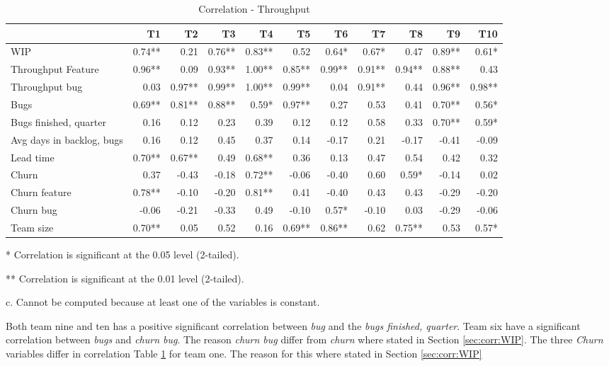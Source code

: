 \documentclass[UKenglish]{ifimaster}  %
\begin{document}
\begin{table}[!htbp]
 \begin{adjustwidth}{-1.5cm}{}
 \centering
 \begin{tabular}{|l|r|r|r|r|r|r|r|r|r|r|}
\hline
 & \bf{T1} & \bf{T2} & \bf{T3} & \bf{T4} & \bf{T5} & \bf{T6} & \bf{T7} & \bf{T8} & \bf{T9} & \bf{T10}\\ \hline
 WIP  & 0.74** & 0.21 & 0.76** & 0.83** & 0.52 & 0.64* & 0.67* & 0.47 & 0.89** & 0.61* \\ \hline
 Throughput Feature  & 0.96** & 0.09 & 0.93** & 1.00** & 0.85** & 0.99** & 0.91** & 0.94** & 0.88** & 0.43 \\ \hline
 Throughput bug  & 0.03 & 0.97** & 0.99** & 1.00** & 0.99** & 0.04 & 0.91** & 0.44 & 0.96** & 0.98** \\ \hline
 Bugs  & 0.69** & 0.81** & 0.88** & 0.59* & 0.97** & 0.27 & 0.53 & 0.41 & 0.70** & 0.56* \\ \hline
 Bugs finished, quarter  & 0.16 & 0.12 & 0.23 & 0.39 & 0.12 & 0.12 & 0.58 & 0.33 & 0.70** & 0.59* \\ \hline
 Avg days in backlog, bugs  & 0.16 & 0.12 & 0.45 & 0.37 & 0.14 & -0.17 & 0.21 & -0.17 & -0.41 & -0.09 \\ \hline
 Lead time  & 0.70** & 0.67** & 0.49 & 0.68** & 0.36 & 0.13 & 0.47 & 0.54 & 0.42 & 0.32 \\ \hline
 Churn  & 0.37 & -0.43 & -0.18 & 0.72** & -0.06 & -0.40 & 0.60 & 0.59* & -0.14 & 0.02 \\ \hline
 Churn feature  & 0.78** & -0.10 & -0.20 & 0.81** & 0.41 & -0.40 & 0.43 & 0.43 & -0.29 & -0.20 \\ \hline
 Churn bug  & -0.06 & -0.21 & -0.33 & 0.49 & -0.10 & 0.57* & -0.10 & 0.03 & -0.29 & -0.06 \\ \hline
 Team size  & 0.70** & 0.05 & 0.52 & 0.16 & 0.69** & 0.86** & 0.62 & 0.75** & 0.53 & 0.57* \\ \hline
\end{tabular}
 \caption{Correlation - Throughput}
 \label{corr:TP}
 \centerline {* Correlation is significant at the 0.05 level (2-tailed).}
\centerline{** Correlation is significant at the 0.01 level (2-tailed).}
\centerline{c. Cannot be computed because at least one of the variables is constant.}
\end{adjustwidth}
\end{table}

Both team nine and ten has a positive significant correlation between \textit{bug} and the \textit{bugs finished, quarter}. Team six have a significant correlation between \textit{bugs} and \textit{churn bug}. The reason \textit{churn bug} differ from \textit{churn} where stated in Section \ref{sec:corr:WIP}.  The three \textit{Churn} variables differ in correlation Table \ref{corr:TP} for team one. The reason for this where stated in Section \ref{sec:corr:WIP} 
\end{document}
